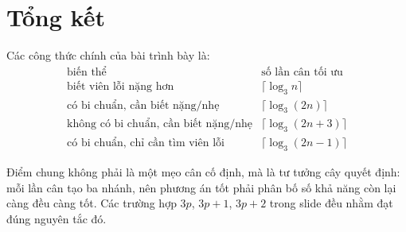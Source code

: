 \documentclass[11pt]{article}
\begin{document}
\section{Tổng kết}

Các công thức chính của bài trình bày là:
\[
\begin{array}{c|c}
\text{biến thể} & \text{số lần cân tối ưu}\\ \hline
\text{biết viên lỗi nặng hơn} & \lceil\log_3 n\rceil\\
\text{có bi chuẩn, cần biết nặng/nhẹ} & \lceil\log_3(2n)\rceil\\
\text{không có bi chuẩn, cần biết nặng/nhẹ} & \lceil\log_3(2n+3)\rceil\\
\text{có bi chuẩn, chỉ cần tìm viên lỗi} & \lceil\log_3(2n-1)\rceil
\end{array}
\]

Điểm chung không phải là một mẹo cân cố định, mà là tư tưởng cây quyết định:
mỗi lần cân tạo ba nhánh, nên phương án tốt phải phân bố số khả năng còn lại
càng đều càng tốt. Các trường hợp \(3p\), \(3p+1\), \(3p+2\) trong slide đều
nhằm đạt đúng nguyên tắc đó.
\end{document}
